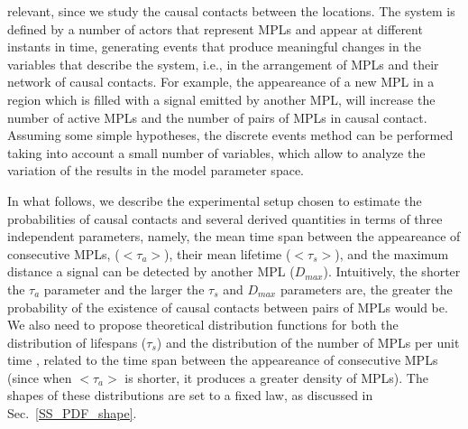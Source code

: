relevant, since we study the causal contacts between the locations.
%
%
The system is defined by a number of actors that represent MPLs and
appear at different instants in time, generating events that produce
meaningful changes in the variables that describe the system, i.e., in
the arrangement of MPLs and their network of causal contacts.
%
For example, the appeareance of a new MPL in a region which is filled
with a signal emitted by another MPL, will increase the number of
active MPLs and the number of pairs of MPLs in causal contact.
%
Assuming some simple hypotheses, the discrete events method can be
performed taking into account a small number of variables, which allow
to analyze the variation of the results in the model parameter space.


In what follows, we describe the experimental setup chosen to estimate
the probabilities of causal contacts and several derived quantities in
terms of three independent parameters, namely, the mean time span
between the appeareance of consecutive MPLs, ($<\tau_a>$), their mean
lifetime ($<\tau_s>$), and the maximum distance a signal can be
detected by another MPL ($D_{max}$).
%
Intuitively, the shorter the $\tau_a$ parameter and the larger the
$\tau_s$ and $D_{max}$ parameters are, the greater the probability of
the existence of causal contacts between pairs of MPLs would be.
%
We also need to propose theoretical distribution functions for both
the distribution of lifespans ($\tau_s$) and the distribution of the
number of MPLs per unit time \citep{maccone_evolution_2014,
Sotos_biotechnology_2019}, related to the time span between the
appeareance of consecutive MPLs (since when $<\tau_a>$ is shorter, it
produces a greater density of MPLs).
%
The shapes of these distributions are set to a fixed law, as discussed
in Sec.~\ref{SS_PDF_shape}.



